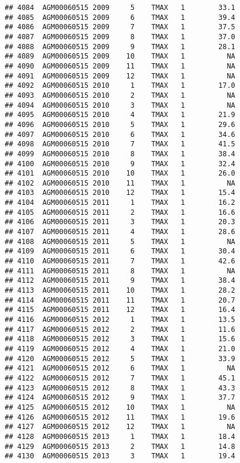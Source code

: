 \documentclass{article}\usepackage[]{graphicx}\usepackage[]{color}
\makeatletter
\newenvironment{kframe}{%
 \def\at@end@of@kframe{}%
 \ifinner\ifhmode%
  \def\at@end@of@kframe{\end{minipage}}%
  \begin{minipage}{\columnwidth}%
 \fi\fi%
 \def\FrameCommand##1{\hskip\@totalleftmargin \hskip-\fboxsep
 \colorbox{shadecolor}{##1}\hskip-\fboxsep
     \hskip-\linewidth \hskip-\@totalleftmargin \hskip\columnwidth}%
 \MakeFramed {\advance\hsize-\width
   \@totalleftmargin\z@ \linewidth\hsize
   \@setminipage}}%
 {\par\unskip\endMakeFramed%
 \at@end@of@kframe}
\newenvironment{knitrout}{}{} %
\makeatother
\begin{document}
\begin{knitrout}
\begin{kframe}
\begin{verbatim}
## 4084  AGM00060515 2009     5    TMAX   1        33.1
## 4085  AGM00060515 2009     6    TMAX   1        39.4
## 4086  AGM00060515 2009     7    TMAX   1        37.5
## 4087  AGM00060515 2009     8    TMAX   1        37.0
## 4088  AGM00060515 2009     9    TMAX   1        28.1
## 4089  AGM00060515 2009    10    TMAX   1          NA
## 4090  AGM00060515 2009    11    TMAX   1          NA
## 4091  AGM00060515 2009    12    TMAX   1          NA
## 4092  AGM00060515 2010     1    TMAX   1        17.0
## 4093  AGM00060515 2010     2    TMAX   1          NA
## 4094  AGM00060515 2010     3    TMAX   1          NA
## 4095  AGM00060515 2010     4    TMAX   1        21.9
## 4096  AGM00060515 2010     5    TMAX   1        29.6
## 4097  AGM00060515 2010     6    TMAX   1        34.6
## 4098  AGM00060515 2010     7    TMAX   1        41.5
## 4099  AGM00060515 2010     8    TMAX   1        38.4
## 4100  AGM00060515 2010     9    TMAX   1        32.4
## 4101  AGM00060515 2010    10    TMAX   1        26.0
## 4102  AGM00060515 2010    11    TMAX   1          NA
## 4103  AGM00060515 2010    12    TMAX   1        15.4
## 4104  AGM00060515 2011     1    TMAX   1        16.2
## 4105  AGM00060515 2011     2    TMAX   1        16.6
## 4106  AGM00060515 2011     3    TMAX   1        20.3
## 4107  AGM00060515 2011     4    TMAX   1        28.6
## 4108  AGM00060515 2011     5    TMAX   1          NA
## 4109  AGM00060515 2011     6    TMAX   1        30.4
## 4110  AGM00060515 2011     7    TMAX   1        42.6
## 4111  AGM00060515 2011     8    TMAX   1          NA
## 4112  AGM00060515 2011     9    TMAX   1        38.4
## 4113  AGM00060515 2011    10    TMAX   1        28.2
## 4114  AGM00060515 2011    11    TMAX   1        20.7
## 4115  AGM00060515 2011    12    TMAX   1        16.4
## 4116  AGM00060515 2012     1    TMAX   1        13.5
## 4117  AGM00060515 2012     2    TMAX   1        11.6
## 4118  AGM00060515 2012     3    TMAX   1        15.6
## 4119  AGM00060515 2012     4    TMAX   1        21.0
## 4120  AGM00060515 2012     5    TMAX   1        33.9
## 4121  AGM00060515 2012     6    TMAX   1          NA
## 4122  AGM00060515 2012     7    TMAX   1        45.1
## 4123  AGM00060515 2012     8    TMAX   1        43.3
## 4124  AGM00060515 2012     9    TMAX   1        37.7
## 4125  AGM00060515 2012    10    TMAX   1          NA
## 4126  AGM00060515 2012    11    TMAX   1        19.6
## 4127  AGM00060515 2012    12    TMAX   1          NA
## 4128  AGM00060515 2013     1    TMAX   1        18.4
## 4129  AGM00060515 2013     2    TMAX   1        14.8
## 4130  AGM00060515 2013     3    TMAX   1        19.4

\end{verbatim}
\end{kframe}
\end{knitrout}
\end{document}
